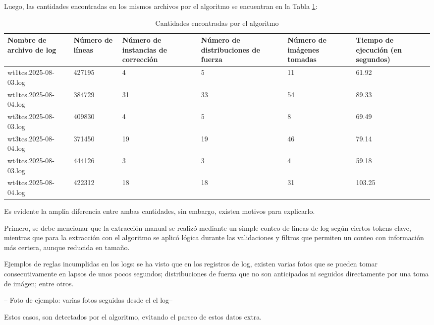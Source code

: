 Luego, las cantidades encontradas en los mismos archivos por el algoritmo se encuentran en la Tabla \ref{table:auto}:


\begin{table}[h]
    \centering
    \caption{\label{table:auto} Cantidades encontradas por el algoritmo}
    \begin{tabular}{|p{2.3cm}|p{2.3cm}|p{2.3cm}|p{2.3cm}|p{2.3cm}|p{2.3cm}|}
        \hline
        Nombre de archivo de log & Número de líneas & Número de instancias de corrección & Número de distribuciones de fuerza & Número de imágenes tomadas & Tiempo de ejecución (en segundos) \\
        \hline
        wt1tcs.2025-08-03.log & 427195 & 4 & 5 & 11 & 61.92 \\
        \hline
        wt1tcs.2025-08-04.log & 384729 & 31 & 33 & 54 & 89.33 \\
        \hline
        wt3tcs.2025-08-03.log & 409830 & 4 & 5 & 8 & 69.49 \\
        \hline
        wt3tcs.2025-08-04.log & 371450 & 19 & 19 & 46 & 79.14 \\
        \hline
        wt4tcs.2025-08-03.log & 444126 & 3 & 3 & 4 & 59.18 \\
        \hline
        wt4tcs.2025-08-04.log & 422312 & 18 & 18 & 31 & 103.25 \\
        \hline
    \end{tabular}
\end{table}

Es evidente la amplia diferencia entre ambas cantidades, sin embargo, existen motivos para explicarlo.

Primero, se debe mencionar que la extracción manual se realizó mediante un simple conteo de lineas de log según ciertos tokens clave, mientras que para la extracción con el algoritmo se aplicó lógica durante las validaciones y filtros que permiten un conteo con información más certera, aunque reducida en tamaño.

Ejemplos de reglas incumplidas en los logs: se ha visto que en los registros de log, existen varias fotos que se pueden tomar consecutivamente en lapsos de unos pocos segundos; distribuciones de fuerza que no son anticipados ni seguidos directamente por una toma de imágen; entre otros.

-- Foto de ejemplo: varias fotos seguidas desde el el log--

Estos casos, son detectados por el algoritmo, evitando el parseo de estos datos extra.

